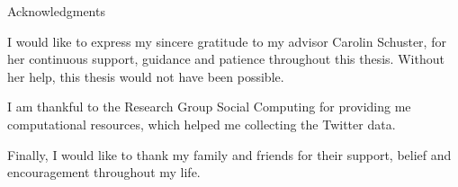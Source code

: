 \thispagestyle{empty}

\vspace*{20mm}

\begin{center}
    { Acknowledgments}
\end{center}

\vspace{10mm}

I would like to express my sincere gratitude to my advisor Carolin Schuster,
for her continuous support, guidance and patience throughout this thesis.
Without her help, this thesis would not have been possible.

I am thankful to the Research Group Social Computing for providing me
computational resources, which helped me collecting the Twitter data.  

Finally, I would like to thank my family and friends for their support,
belief and encouragement throughout my life.


\cleardoublepage{}
